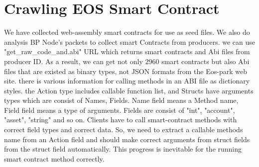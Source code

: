 \section{Crawling EOS Smart Contract}
We have collected web-assembly smart contracts for use as seed files.
We also do analysis BP Node's packets to collect smart Contracts from producers. we can use  "get\_raw\_code\_and.abi" URL which returns smart contracts and Abi files from producer ID. As a result, we can get not only 2960 smart contracts but also Abi files that are existed as binary types, not JSON formats from the Eos-park web site.
there is various information for calling methods in an ABI file as dictionary styles. 
the Action type includes callable function list, and Structs have arguments types which are consist of Names, Fields. Name field means a Method name, Field field means a type of arguments.
Fields are consist of "int", "account", "asset", "string" and so on. Clients have to call smart-contract methods with correct field types and correct data. So, we need to extract a callable methods name from an Action field and should make correct arguments from struct fields from the struct field automatically. This progress is inevitable for the running smart contract method correctly.

